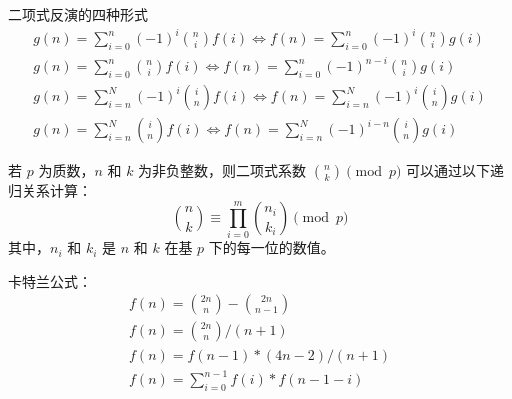 \begin{theorem}[二项式反演]
二项式反演的四种形式
\begin{align}
    g(n) = \sum_{i = 0}^{n} (-1)^i \binom{n}{i}f(i) \Longleftrightarrow f(n) = \sum_{i = 0}^{n} (-1)^i \binom{n}{i} g(i) \\
    g(n) = \sum_{i = 0}^{n} \binom{n}{i} f(i) \Longleftrightarrow f(n) = \sum_{i = 0}^{n} (-1)^{n - i} \binom{n}{i} g(i) \\
    g(n) = \sum_{i = n}^{N} (-1)^i \binom{i}{n}f(i) \Longleftrightarrow f(n) = \sum_{i = n}^{N} (-1)^i \binom{i}{n} g(i) \\
    g(n) = \sum_{i = n}^{N} \binom{i}{n} f(i) \Longleftrightarrow f(n) = \sum_{i = n}^{N} (-1)^{i - n} \binom{i}{n} g(i)
\end{align}

\end{theorem}

\begin{theorem}[卢卡斯定理]
若 $p$ 为质数，$n$ 和 $k$ 为非负整数，则二项式系数 $\binom{n}{k} \pmod{p}$ 可以通过以下递归关系计算：
\[
\binom{n}{k} \equiv \prod_{i=0}^{m} \binom{n_i}{k_i} \pmod{p}
\]
其中，$n_i$ 和 $k_i$ 是 $n$ 和 $k$ 在基 $p$ 下的每一位的数值。
\end{theorem}

\begin{theorem}[卡特兰数]
卡特兰公式：
\begin{align}
    f(n) = \binom{2n}{n} - \binom{2n}{n - 1} \tag{1}\\
    f(n) = \binom{2n}{n} / (n + 1) \tag{2}\\
    f(n) = f(n - 1) \ast (4n - 2) / (n + 1) \tag{3}\\
    f(n) = \sum_{i = 0}^{n - 1} f(i) \ast f(n - 1 - i)\tag{4}
\end{align}
\end{theorem}